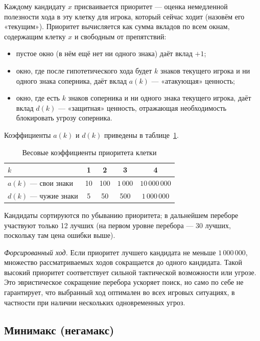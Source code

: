 \documentclass[14pt,a4paper]{extarticle}
\begin{document}
	Каждому кандидату $x$ присваивается приоритет --- оценка немедленной полезности хода в эту клетку для игрока, который сейчас ходит (назовём его «текущим»). Приоритет вычисляется как сумма вкладов по всем окнам, содержащим клетку $x$ и свободным от препятствий:
	\begin{itemize}
		\item пустое окно (в нём ещё нет ни одного знака) даёт вклад $+1$;
		\item окно, где после гипотетического хода будет $k$ знаков текущего игрока и ни одного знака соперника, даёт вклад $a(k)$ --- «атакующая» ценность;
		\item окно, где есть $k$ знаков соперника и ни одного знака текущего игрока, даёт вклад $d(k)$ --- «защитная» ценность, отражающая необходимость блокировать угрозу соперника.
	\end{itemize}
	Коэффициенты $a(k)$ и $d(k)$ приведены в таблице~\ref{tab:ad}.
	
	\begin{table}[h!]
		\captionsetup{position=above}
		\caption{Весовые коэффициенты приоритета клетки}\label{tab:ad}
		\centering\small
		\begin{tabular}{|l|c|c|c|c|}
			\hline
			$k$ & 1 & 2 & 3 & 4\\ \hline
			$a(k)$ --- свои знаки & 10 & 100 & $1\,000$ & $10\,000\,000$\\ \hline
			$d(k)$ --- чужие знаки & 5 & 50 & 500 & $1\,000\,000$\\ \hline
		\end{tabular}
	\end{table}
	
	Кандидаты сортируются по убыванию приоритета; в дальнейшем переборе участвуют только 12 лучших (на первом уровне перебора --- 30 лучших, поскольку там цена ошибки выше).
	
	\emph{Форсированный ход.} Если приоритет лучшего кандидата не меньше $1\,000\,000$, множество рассматриваемых ходов сокращается до одного кандидата. Такой высокий приоритет соответствует сильной тактической возможности или угрозе. Это эвристическое сокращение перебора ускоряет поиск, но само по себе не гарантирует, что выбранный ход оптимален во всех игровых ситуациях, в частности при наличии нескольких одновременных угроз.
	
	\subsection{Минимакс (негамакс)}\label{sec:m-search}
	
\end{document}
